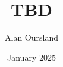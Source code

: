 \documentclass[11pt]{article}
\title{TBD}
\author{Alan Oursland}
\affil{\textit{alan.oursland@gmail.com}}
\date{January 2025}
\begin{document}
\maketitle

\begin{abstract}

\end{abstract}

% 
% 
% 



% 

% 
% 


% 
% 
% 
\end{document}
